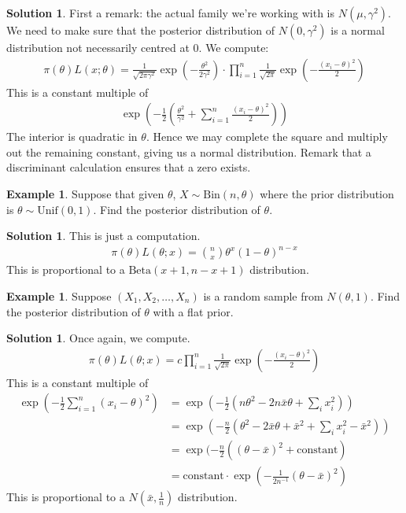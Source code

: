 \documentclass[11pt]{amsart}
\theoremstyle{definition}
\newtheorem{example}[theorem]{Example}
\newtheorem{solution}[theorem]{Solution}
\numberwithin{equation}{section}
\begin{document}
\addtocounter{theorem}{-1}
\begin{solution}
    First a remark: the actual family we're working with is $N(\mu,\gamma^2)$. We need to make sure that the posterior distribution of $N(0,\gamma^2)$ is a normal distribution not necessarily centred at 0. We compute:
    \begin{align*}
        \pi(\theta)L(x;\theta)=\frac{1}{\sqrt{2\pi\gamma^2}}\exp(-\frac{\theta^2}{2\gamma^2})\cdot\prod_{i=1}^n\frac{1}{\sqrt{2\pi}}\exp(-\frac{(x_i-\theta)^2}{2})
    \end{align*}
    This is a constant multiple of
    \begin{align*}
        \exp\left(-\frac{1}{2}\left(\frac{\theta^2}{\gamma^2}+\sum_{i=1}^n\frac{(x_i-\theta)^2}{2}\right)\right)
    \end{align*}
    The interior is quadratic in $\theta$. Hence we may complete the square and multiply out the remaining constant, giving us a normal distribution. Remark that a discriminant calculation ensures that a zero exists.
\end{solution}
\begin{example}\label{bayesex4}
    Suppose that given $\theta$, $X\sim\mathrm{Bin}(n,\theta)$ where the prior distribution is $\theta\sim\mathrm{Unif}(0,1)$. Find the posterior distribution of $\theta$.
\end{example}
\addtocounter{theorem}{-1}
\begin{solution}
    This is just a computation.
    \begin{align*}
        \pi(\theta)L(\theta;x)=\binom{n}{x}\theta^x(1-\theta)^{n-x}
    \end{align*}
    This is proportional to a $\mathrm{Beta}(x+1,n-x+1)$ distribution.
\end{solution}
\begin{example}\label{bayesex5}
    Suppose $(X_1,X_2,\ldots,X_n)$ is a random sample from $N(\theta,1)$. Find the posterior distribution of $\theta$ with a flat prior.
\end{example}
\addtocounter{theorem}{-1}
\begin{solution}
    Once again, we compute.
    \begin{align*}
        \pi(\theta)L(\theta;x)=c\prod_{i=1}^n\frac{1}{\sqrt{2\pi}}\exp(-\frac{(x_i-\theta)^2}{2})
    \end{align*}
    This is a constant multiple of
    \begin{align*}
        \exp(-\frac{1}{2}\sum_{i=1}^n(x_i-\theta)^2)&=\exp(-\frac{1}{2}(n\theta^2-2n\bar x\theta+\sum_{i}x_i^2))\\
        &=\exp(-\frac{n}{2}(\theta^2-2\bar x\theta+\bar x^2+\sum_ix_i^2-\bar x^2))\\
        &=\exp(-\frac{n}{2}((\theta-\bar x)^2+\mathrm{constant})\\
        &=\mathrm{constant}\cdot\exp(-\frac{1}{2n^{-1}}(\theta-\bar x)^2)
    \end{align*}
    This is proportional to a $N(\bar x,\frac{1}{n})$ distribution.
\end{solution}
\end{document}
